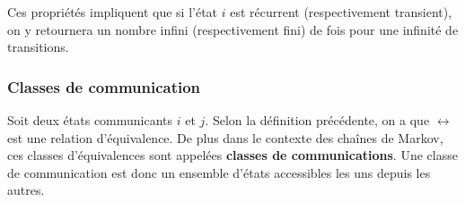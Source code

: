 \documentclass{article}
\begin{document}
Ces propriétés impliquent que si l'état $i$ est récurrent (respectivement transient), on y retournera un nombre infini (respectivement fini) de fois pour une infinité de transitions.

\subsubsection{Classes de communication}

\begin{tcolorbox}[colback=white,colframe=red!80!black,title=Classe de communication]
Soit deux états communicants $i$ et $j$. Selon la définition précédente, on a que $\leftrightarrow$ est une relation d'équivalence. De plus dans le contexte des chaînes de Markov, ces classes d'équivalences sont appelées \textbf{classes de communications}.
Une classe de communication est donc un ensemble d'états accessibles les uns depuis les autres.
\end{tcolorbox}
\end{document}
